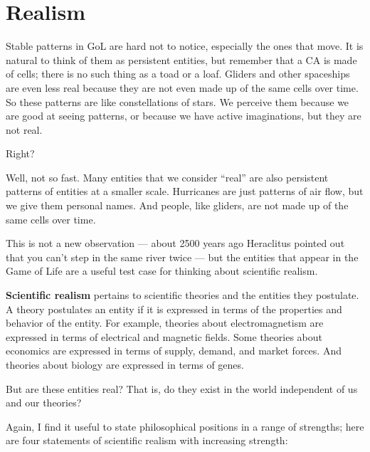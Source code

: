 \documentclass[12pt]{book}
\theoremstyle{exercise}
\begin{document}


\section{Realism}

Stable patterns in GoL are hard not to notice, especially the ones
that move.  It is natural to think of them as persistent entities, but
remember that a CA is made of cells; there is no such thing as a toad
or a loaf.  Gliders and other spaceships are even less real because
they are not even made up of the same cells over time.  So these
patterns are like constellations of stars.  We perceive them because
we are good at seeing patterns, or because we have active
imaginations, but they are not real.


Right?

Well, not so fast.  Many entities that we consider ``real'' are also
persistent patterns of entities at a smaller scale.  Hurricanes are
just patterns of air flow, but we give them personal names.  And
people, like gliders, are not made up of the same cells over time.


This is not a new observation --- about 2500 years ago Heraclitus
pointed out that you can't step in the same river twice --- but the
entities that appear in the Game of Life are a useful test case for
thinking about scientific realism.


{\bf Scientific realism} pertains to scientific theories and the
entities they postulate.
A theory postulates an entity if it is
expressed in terms of the properties and behavior of the entity.
For example, theories about electromagnetism are expressed in
terms of electrical and magnetic fields.  Some theories about economics
are expressed in terms of supply, demand, and market forces.
And theories about biology are expressed in terms of genes.

But are these entities real?  That is, do they exist in the world
independent of us and our theories?


Again, I find it useful to state philosophical positions in a range of
strengths; here are four statements of scientific realism with increasing
strength:
\end{document}
